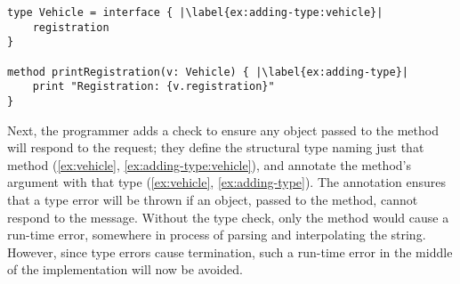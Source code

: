 \begin{lstlisting}[label={ex:vehicle},caption={Adding a type annotation to a method parameter.},escapechar=|,columns=flexible,float,floatplacement=H]
type Vehicle = interface { |\label{ex:adding-type:vehicle}|
    registration    
}

method printRegistration(v: Vehicle) { |\label{ex:adding-type}|
    print "Registration: {v.registration}"
}
\end{lstlisting}

Next, the programmer adds a check to ensure any object passed to the
 method will respond to the
 request; 
they define the structural type \citep{theCleanVehicle}
naming just that method (\cref{ex:vehicle}, \cref{ex:adding-type:vehicle}), 
and annotate the  method's
argument with that type (\cref{ex:vehicle}, \cref{ex:adding-type}).
The annotation ensures that a type error will be thrown if an object,
passed to the  method,
cannot respond to the  message.
Without the type check, only the  method would
cause a run-time error, somewhere in process of parsing
and interpolating the string.
However, since type errors cause termination, 
such a run-time error in the middle of the
 implementation
will now be avoided.





